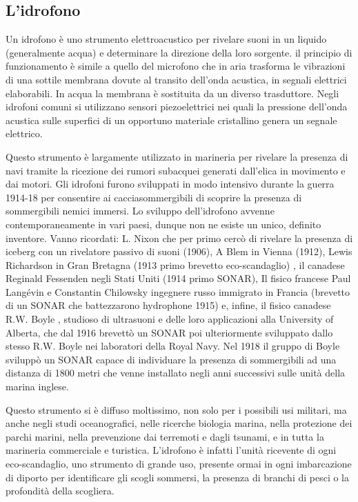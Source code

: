 \subsection{L'idrofono}
Un idrofono è uno strumento elettroacustico per rivelare suoni in un liquido (generalmente acqua) e determinare la direzione della loro sorgente. il principio di funzionamento è simile a quello del microfono che in aria trasforma le vibrazioni di una sottile membrana dovute al transito dell’onda acustica, in segnali elettrici elaborabili. In acqua la membrana è sostituita da un diverso trasduttore. Negli idrofoni comuni si utilizzano sensori piezoelettrici nei quali la pressione dell’onda acustica sulle superfici di un opportuno materiale cristallino genera un segnale elettrico.

Questo strumento è largamente utilizzato in marineria per rivelare la presenza di navi tramite la ricezione dei rumori subacquei generati dall'elica in movimento e dai motori. Gli idrofoni furono sviluppati in modo intensivo durante la guerra 1914-18 per consentire ai cacciasommergibili di scoprire la presenza di sommergibili nemici immersi. Lo sviluppo dell’idrofono avvenne contemporaneamente in vari paesi, dunque non ne esiste un unico, definito inventore. 
Vanno ricordati: L. Nixon che per primo cercò di rivelare la presenza di iceberg con un rivelatore passivo di suoni (1906), A Blem in Vienna (1912), Lewis Richardson in Gran Bretagna (1913 primo brevetto eco-scandaglio) , il canadese Reginald Fessenden negli Stati Uniti (1914 primo SONAR), Il fisico francese Paul Langévin e Constantin Chilowsky ingegnere russo immigrato in Francia (brevetto di un SONAR che battezzarono hydrophone 1915) e, infine, il fisico canadese R.W. Boyle , studioso di ultrasuoni e delle loro applicazioni alla University of Alberta, che dal 1916 brevettò un SONAR poi ulteriormente sviluppato dallo stesso R.W. Boyle nei laboratori della Royal Navy. Nel 1918 il gruppo di Boyle sviluppò un SONAR capace di individuare la presenza di sommergibili ad una distanza di 1800 metri che venne installato negli anni successivi sulle unità della marina inglese.

Questo strumento si è diffuso moltissimo, non solo per i possibili usi militari, ma anche negli studi oceanografici, nelle ricerche biologia marina, nella protezione dei parchi marini, nella prevenzione dai terremoti e dagli tsunami, e in tutta la marineria commerciale e turistica. L’idrofono è infatti l’unità ricevente di ogni eco-scandaglio, uno strumento di grande uso, presente ormai in ogni imbarcazione di diporto per identificare gli scogli sommersi, la presenza di branchi di pesci o la profondità della scogliera.

